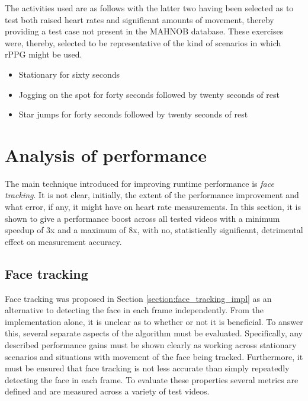 The activities used are as follows with the latter two having been selected as to test both raised heart rates and significant amounts of movement, thereby providing a test case not present in the MAHNOB database.
These exercises were, thereby, selected to be representative of the kind of scenarios in which rPPG might be used.
\begin{itemize}
   \item Stationary for sixty seconds
   \item Jogging on the spot for forty seconds followed by twenty seconds of rest
   \item Star jumps for forty seconds followed by twenty seconds of rest
\end{itemize}






\section{Analysis of performance}
\label{section:face_tracking}
The main technique introduced for improving runtime performance is \textit{face tracking}. It is not clear, initially, the extent of the performance improvement and what error, if any, it might have 
on heart rate measurements. In this section, it is shown to give a performance boost across all tested videos with a minimum speedup of 3x and a maximum of 8x, with no, statistically significant, detrimental effect on measurement accuracy.

\subsection{Face tracking}
Face tracking was proposed in Section \ref{section:face_tracking_impl} as an alternative to detecting the face in each frame independently.
From the implementation alone, it is unclear as to whether or not it is beneficial. To answer this, several separate aspects of the algorithm must be evaluated. 
Specifically, any described performance gains must be shown clearly as working across stationary scenarios and situations with movement of the face being tracked. 
Furthermore, it must be ensured that face tracking is not less accurate than simply repeatedly detecting the face in each frame. 
To evaluate these properties several metrics are defined and are measured across a variety of test videos.
